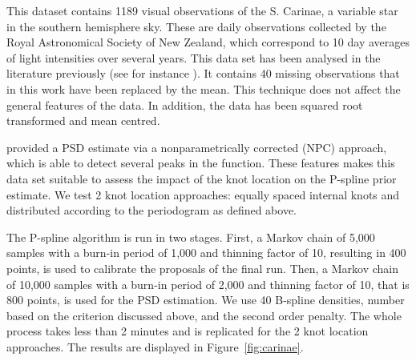 \documentclass[aps,reprint,amsmath,amssymb,showpacs,showkeys]{revtex4-1}%
\begin{document}
This dataset contains 1189 visual observations of the S. Carinae, a variable star in the southern hemisphere sky.  These are daily observations collected by the Royal Astronomical Society of New Zealand, which correspond to 10 day averages of light intensities over several years.  This data set has been analysed in the literature previously (see for instance \cite{Cart:1997,Huerta:1999,Kirch:2018}).  It contains 40 missing observations that in this work have been replaced by the mean.  This technique does not affect the general features of the data.  In addition, the data has been squared root transformed and mean centred.  

\cite{Kirch:2018} provided a PSD estimate via a nonparametrically corrected (NPC) approach, which is able to detect several peaks in the function.  These features makes this data set suitable to assess the impact of the knot location on the P-spline prior estimate. We test 2 knot location approaches: equally spaced internal knots and distributed according to the periodogram as defined above.

The P-spline algorithm is run in two stages.  First, a Markov chain of 5,000 samples with a burn-in period of 1,000 and thinning factor of 10, resulting in 400 points, is used to calibrate the proposals of the final run.  Then, a Markov chain of 10,000 samples with a burn-in period of 2,000 and thinning factor of 10, that is 800 points, is used for the PSD estimation.  We use 40 B-spline densities, number based on the criterion discussed above, and the second order penalty.  The whole process takes less than 2 minutes and is replicated for the 2 knot location approaches.  The results are displayed in Figure~\ref{fig:carinae}.
\end{document}
